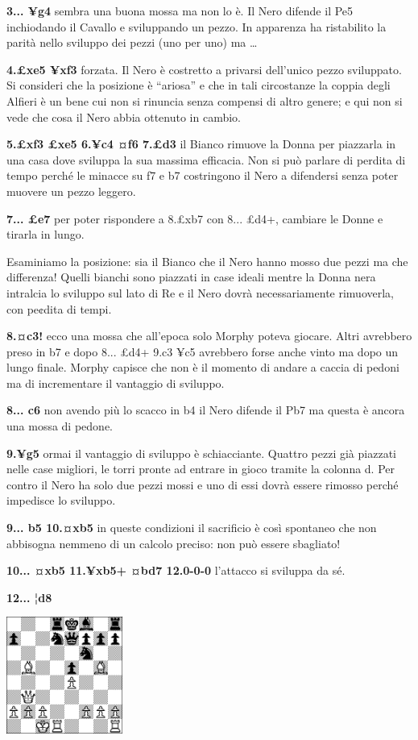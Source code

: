 \documentclass[
]{article}
\begin{document}
\textbf{3... ¥g4} sembra una buona mossa ma non lo è. Il Nero difende il
Pe5 inchiodando il Cavallo e sviluppando un pezzo. In apparenza ha
ristabilito la parità nello sviluppo dei pezzi (uno per uno) ma \ldots{}

\textbf{4.£xe5 ¥xf3} forzata. Il Nero è costretto a privarsi dell'unico
pezzo sviluppato. Si consideri che la posizione è ``ariosa'' e che in
tali circostanze la coppia degli Alfieri è un bene cui non si rinuncia
senza compensi di altro genere; e qui non si vede che cosa il Nero abbia
ottenuto in cambio.

\textbf{5.£xf3 £xe5 6.¥c4 ¤f6 7.£d3} il Bianco rimuove la Donna per
piazzarla in una casa dove sviluppa la sua massima efficacia. Non si può
parlare di perdita di tempo perché le minacce su f7 e b7 costringono il
Nero a difendersi senza poter muovere un pezzo leggero.

\textbf{7... £e7} per poter rispondere a 8.£xb7 con 8... £d4+, cambiare
le Donne e tirarla in lungo.

Esaminiamo la posizione: sia il Bianco che il Nero hanno mosso due pezzi
ma che differenza! Quelli bianchi sono piazzati in case ideali mentre la
Donna nera intralcia lo sviluppo sul lato di Re e il Nero dovrà
necessariamente rimuoverla, con pe¢dita di tempi.

\textbf{8.¤c3!} ecco una mossa che all'epoca solo Morphy poteva giocare.
Altri avrebbero preso in b7 e dopo 8... £d4+ 9.c3 ¥c5 avrebbero forse
anche vinto ma dopo un lungo finale. Morphy capisce che non è il momento
di andare a caccia di pedoni ma di incrementare il vantaggio di
sviluppo.

\textbf{8... c6} non avendo più lo scacco in b4 il Nero difende il Pb7
ma questa è ancora una mossa di pedone.

\textbf{9.¥g5} ormai il vantaggio di sviluppo è schiacciante. Quattro
pezzi già piazzati nelle case migliori, le torri pronte ad entrare in
gioco tramite la colonna d. Per contro il Nero ha solo due pezzi mossi e
uno di essi dovrà essere rimosso perché impedisce lo sviluppo.

\textbf{9... b5 10.¤xb5} in queste condizioni il sacrificio è così
spontaneo che non abbisogna nemmeno di un calcolo preciso: non può
essere sbagliato!

\textbf{10... ¤xb5 11.¥xb5+ ¤bd7 12.0-0-0} l'attacco si sviluppa da sé.

\textbf{12... ¦d8}

\includegraphics[width=1.50417in,height=1.50417in]{vertopal_109f12be458a423d8f3cc838880eaea2/media/image5.png}
\end{document}
